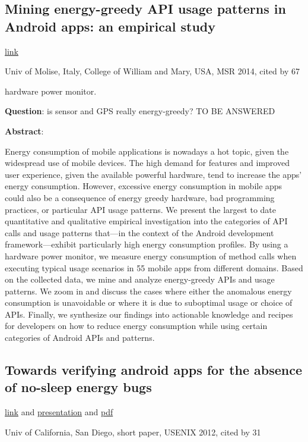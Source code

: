 \subsection{Mining energy-greedy API usage patterns in Android apps: an empirical
  study}

\href{http://dl.acm.org/citation.cfm?id=2597085}{link}

Univ of Molise, Italy, College of William and Mary, USA, MSR 2014, cited by 67

hardware power monitor.

\textbf{Question}: is sensor and GPS really energy-greedy? TO BE ANSWERED

\textbf{Abstract}:

Energy consumption of mobile applications is nowadays a hot topic, given the
widespread use of mobile devices. The high demand for features and improved user
experience, given the available powerful hardware, tend to increase the apps’
energy consumption. However, excessive energy consumption in mobile apps could
also be a consequence of energy greedy hardware, bad programming practices, or
particular API usage patterns. We present the largest to date quantitative and
qualitative empirical investigation into the categories of API calls and usage
patterns that—in the context of the Android development framework—exhibit
particularly high energy consumption profiles. By using a hardware power
monitor, we measure energy consumption of method calls when executing typical
usage scenarios in 55 mobile apps from different domains. Based on the collected
data, we mine and analyze energy-greedy APIs and usage patterns. We zoom in and
discuss the cases where either the anomalous energy consumption is unavoidable
or where it is due to suboptimal usage or choice of APIs. Finally, we synthesize
our findings into actionable knowledge and recipes for developers on how to
reduce energy consumption while using certain categories of Android APIs and
patterns.

\subsection{Towards verifying android apps for the absence of no-sleep energy bugs}
\href{http://dl.acm.org/citation.cfm?id=2387872}{link} and
\href{https://www.usenix.org/conference/hotpower12/workshop-program/presentation/vekris}{presentation}
and
\href{https://www.usenix.org/system/files/conference/hotpower12/hotpower12-final27.pdf}{pdf}

Univ of California, San Diego, short paper, USENIX 2012, cited by 31

